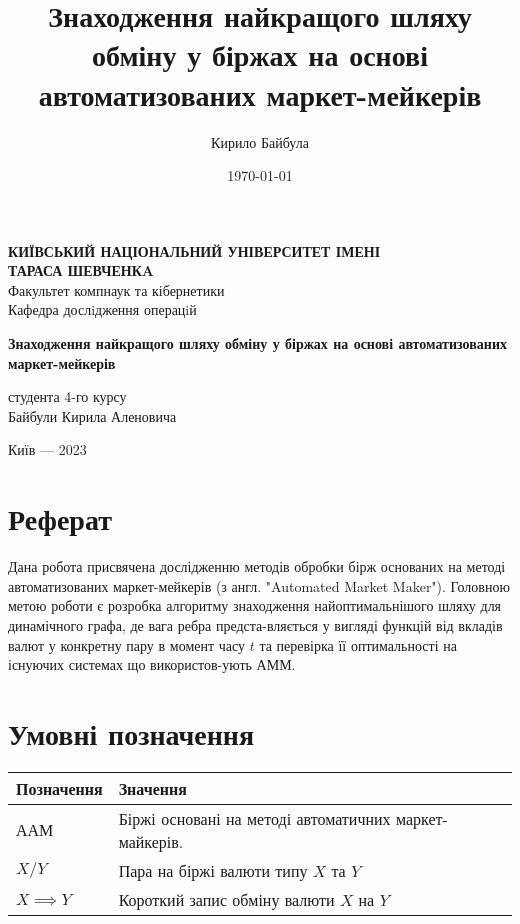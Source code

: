 \documentclass[a4paper, 11pt]{article}
\author{Кирило Байбула}
\date{\today}
\title{Знаходження найкращого шляху обміну у біржах на основі автоматизованих маркет-мейкерів}
\newcommand{\tqs}{\textquotesingle}
\begin{document}
\begin{titlepage}
   \begin{center}
       \vspace*{1cm}

       \textbf{КИЇВСЬКИЙ НАЦІОНАЛЬНИЙ УНІВЕРСИТЕТ ІМЕНІ \\ ТАРАСА ШЕВЧЕНКA} \\
        Факультет комп наук та кібернетики \\
        Кафедра дослiдження операцiй

       \vspace{2.0cm}
            \textbf{Знаходження найкращого шляху обміну у біржах на основі автоматизованих маркет-мейкерів} \\
       \vspace{1.5cm}
        \begin{flushright}
            студента 4-го курсу \\
            Байбули Кирила Аленовича
        \end{flushright}

       \vfill

       \vspace{0.8cm}
        Київ ---  2023
   \end{center}
\end{titlepage}
\newpage


\section{Реферат}
\label{sec:abstract}

Дана робота присвячена дослідженню методів обробки бірж основаних на методі
автоматизованих маркет-мейкерів (з англ. "Automated Market Maker"). Головною
метою роботи є розробка алгоритму знаходження найоптимальнішого шляху для
динамічного графа, де вага ребра предста-вляється у вигляді функцій від вкладів
валют у конкретну пару в момент часу \(t\) та перевірка її оптимальності на
існуючих системах що використов-ують АММ.

\newpage

\section*{Умовні позначення}
\label{sec:notation}

\begin{center}
\begin{tabular}{ll}
Позначення & Значення\\[0pt]
\hline
ААМ & Біржі основані на методі автоматичних маркет-майкерів.\\[0pt]
\(X/Y\) & Пара на біржі валюти типу \(X\) та \(Y\)\\[0pt]
\(X \implies Y\) & Короткий запис обміну валюти \(X\) на \(Y\)\\[0pt]
\end{tabular}
\end{center}
\end{document}
